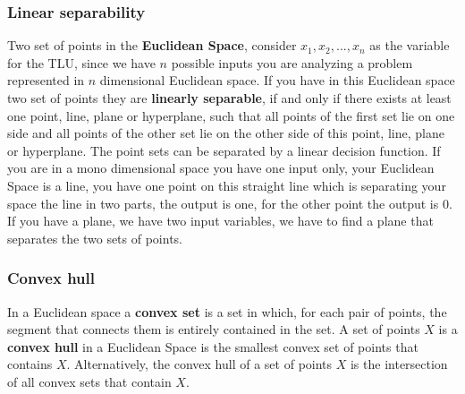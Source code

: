 \documentclass{article}
\begin{document}
\subsubsection{Linear separability}
Two set of points in the \textbf{Euclidean Space}, consider $x_1, x_2,...,x_n$ as the variable for
the TLU, since we have $n$ possible inputs you are analyzing a problem represented in $n$
dimensional Euclidean space.
\newline\newline
If you have in this Euclidean space two set of points they are \textbf{linearly separable},
if and only if there exists at least one point, line, plane or hyperplane, such that all
points of the first set lie on one side and all points of the other set lie on the
other side of this point, line, plane or hyperplane.
\newline\newline
The point sets can be separated by a linear decision function.
\newline\newline
If you are in a mono dimensional space you have one input only,
your Euclidean Space is a line, you have one point on this straight line which is separating
your space the line in two parts, the output is one, for the other point the output is $0$.
If you have a plane, we have two input variables, we have to find a plane that separates
the two sets of points.

\subsubsection{Convex hull}
In a Euclidean space a \textbf{convex set} is a set in which, for each pair of points,
the segment that connects them is entirely contained in the set.
\newline\newline
A set of points $X$ is a \textbf{convex hull} in a Euclidean Space is the smallest convex set of
points that contains $X$. Alternatively, the convex hull of a set of points $X$ is the intersection
of all convex sets that contain $X$.
\end{document}
